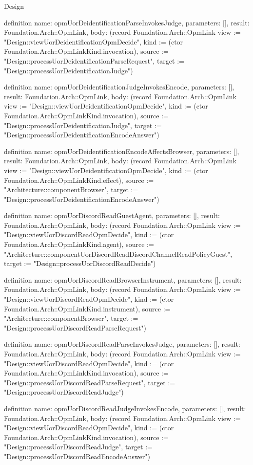 \begin{lexlean}{Design}
\begin{semanticmodule}
definition{
  name: opmUorDeidentificationParseInvokesJudge,
  parameters: [],
  result: Foundation.Arch::OpmLink,
  body: (record Foundation.Arch::OpmLink {view := "Design::viewUorDeidentificationOpmDecide", kind := (ctor Foundation.Arch::OpmLinkKind.invocation), source := "Design::processUorDeidentificationParseRequest", target := "Design::processUorDeidentificationJudge"})
}

definition{
  name: opmUorDeidentificationJudgeInvokesEncode,
  parameters: [],
  result: Foundation.Arch::OpmLink,
  body: (record Foundation.Arch::OpmLink {view := "Design::viewUorDeidentificationOpmDecide", kind := (ctor Foundation.Arch::OpmLinkKind.invocation), source := "Design::processUorDeidentificationJudge", target := "Design::processUorDeidentificationEncodeAnswer"})
}

definition{
  name: opmUorDeidentificationEncodeAffectsBrowser,
  parameters: [],
  result: Foundation.Arch::OpmLink,
  body: (record Foundation.Arch::OpmLink {view := "Design::viewUorDeidentificationOpmDecide", kind := (ctor Foundation.Arch::OpmLinkKind.effect), source := "Architecture::componentBrowser", target := "Design::processUorDeidentificationEncodeAnswer"})
}

definition{
  name: opmUorDiscordReadGuestAgent,
  parameters: [],
  result: Foundation.Arch::OpmLink,
  body: (record Foundation.Arch::OpmLink {view := "Design::viewUorDiscordReadOpmDecide", kind := (ctor Foundation.Arch::OpmLinkKind.agent), source := "Architecture::componentUorDiscordReadDiscordChannelReadPolicyGuest", target := "Design::processUorDiscordReadDecide"})
}

definition{
  name: opmUorDiscordReadBrowserInstrument,
  parameters: [],
  result: Foundation.Arch::OpmLink,
  body: (record Foundation.Arch::OpmLink {view := "Design::viewUorDiscordReadOpmDecide", kind := (ctor Foundation.Arch::OpmLinkKind.instrument), source := "Architecture::componentBrowser", target := "Design::processUorDiscordReadParseRequest"})
}

definition{
  name: opmUorDiscordReadParseInvokesJudge,
  parameters: [],
  result: Foundation.Arch::OpmLink,
  body: (record Foundation.Arch::OpmLink {view := "Design::viewUorDiscordReadOpmDecide", kind := (ctor Foundation.Arch::OpmLinkKind.invocation), source := "Design::processUorDiscordReadParseRequest", target := "Design::processUorDiscordReadJudge"})
}

definition{
  name: opmUorDiscordReadJudgeInvokesEncode,
  parameters: [],
  result: Foundation.Arch::OpmLink,
  body: (record Foundation.Arch::OpmLink {view := "Design::viewUorDiscordReadOpmDecide", kind := (ctor Foundation.Arch::OpmLinkKind.invocation), source := "Design::processUorDiscordReadJudge", target := "Design::processUorDiscordReadEncodeAnswer"})
}


\end{semanticmodule}
\end{lexlean}
